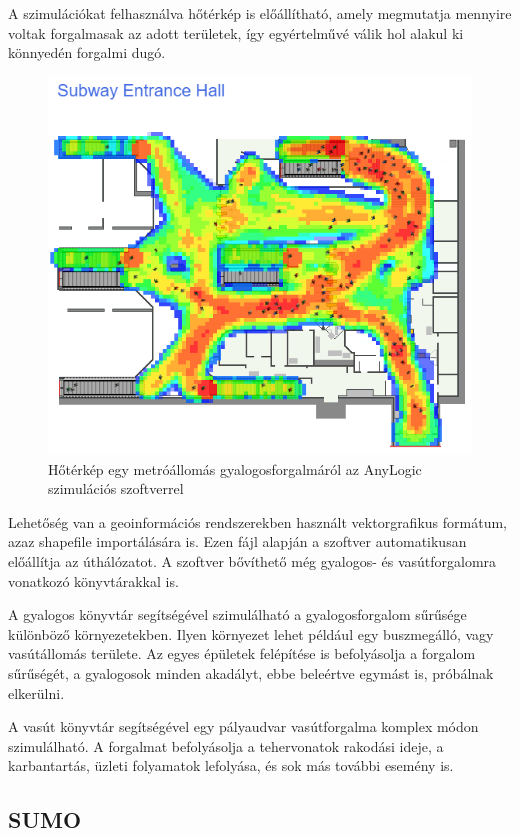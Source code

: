 A szimulációkat felhasználva hőtérkép is előállítható, amely megmutatja mennyire voltak
forgalmasak az adott területek, így egyértelművé válik hol alakul ki könnyedén forgalmi dugó.
\begin{figure}[H]
\includegraphics[width=\linewidth]{heatmap.png}
\caption{Hőtérkép egy metróállomás gyalogosforgalmáról az AnyLogic szimulációs szoftverrel}
\label{fig:heatmp}
\end{figure}

Lehetőség van a geoinformációs rendszerekben használt vektorgrafikus formátum, azaz shapefile importálására is. Ezen fájl alapján a szoftver automatikusan
előállítja az úthálózatot. A szoftver bővíthető még gyalogos- és vasútforgalomra vonatkozó könyvtárakkal is.

A gyalogos könyvtár segítségével szimulálható a gyalogosforgalom sűrűsége különböző környezetekben. Ilyen környezet lehet például egy buszmegálló, vagy vasútállomás területe. Az egyes épületek
felépítése is befolyásolja a forgalom sűrűségét, a gyalogosok minden akadályt, ebbe beleértve egymást is, próbálnak elkerülni.

A vasút könyvtár segítségével egy pályaudvar vasútforgalma komplex módon szimulálható. A forgalmat befolyásolja a tehervonatok rakodási ideje, a karbantartás, üzleti folyamatok lefolyása, és sok
más további esemény is.
\subsection{SUMO}

